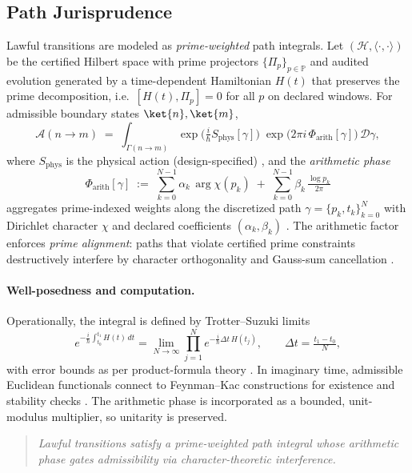 \documentclass[12pt]{amsart}
\theoremstyle{plain}
\begin{document}
\subsection{Path Jurisprudence}

Lawful transitions are modeled as \emph{prime-weighted} path integrals. Let $(\mathcal{H},\langle\cdot,\cdot\rangle)$ be the certified Hilbert space with prime projectors $\{\Pi_p\}_{p\in\mathbb{P}}$ and audited evolution generated by a time-dependent Hamiltonian $H(t)$ that preserves the prime decomposition, i.e.\ $[H(t),\Pi_p]=0$ for all $p$ on declared windows. For admissible boundary states $\ket{n},\ket{m}$,
\[
\mathcal{A}(n\!\to\! m)\;=\;\int_{\Gamma(n\to m)} \exp\!\Big(\tfrac{i}{\hbar}S_{\mathrm{phys}}[\gamma]\Big)\;
\exp\!\big(2\pi i\,\Phi_{\mathrm{arith}}[\gamma]\big)\, \mathcal{D}\gamma,
\]
where $S_{\mathrm{phys}}$ is the physical action (design-specified) \cite{feynman1965path,schulman1981techniques}, and the \emph{arithmetic phase}
\[
\Phi_{\mathrm{arith}}[\gamma]\;:=\;\sum_{k=0}^{N-1}\alpha_k\,\arg \chi(p_k)\;+\;\sum_{k=0}^{N-1}\beta_k\,\tfrac{\log p_k}{2\pi}
\]
aggregates prime-indexed weights along the discretized path $\gamma=\{p_k,t_k\}_{k=0}^{N}$ with Dirichlet character $\chi$ and declared coefficients $(\alpha_k,\beta_k)$ \cite{davenport2000multiplicative,iwaniec2004analytic}. The arithmetic factor enforces \emph{prime alignment}: paths that violate certified prime constraints destructively interfere by character orthogonality and Gauss-sum cancellation \cite{davenport2000multiplicative}.

\paragraph{Well-posedness and computation.}
Operationally, the integral is defined by Trotter–Suzuki limits
\[
e^{-\tfrac{i}{\hbar}\int_{t_0}^{t_1}\!H(t)\,dt}
=\lim_{N\to\infty}\prod_{j=1}^{N}e^{-\tfrac{i}{\hbar}\Delta t\,H(t_j)}\!,
\qquad \Delta t=\tfrac{t_1-t_0}{N},
\]
with error bounds as per product-formula theory \cite{trotter1959product,suzuki1976generalized}. In imaginary time, admissible Euclidean functionals connect to Feynman–Kac constructions for existence and stability checks \cite{simon2005functional}. The arithmetic phase is incorporated as a bounded, unit-modulus multiplier, so unitarity is preserved.

\begin{quote}
\textit{Lawful transitions satisfy a prime-weighted path integral whose arithmetic phase gates admissibility via character-theoretic interference.}
\end{quote}
\end{document}
